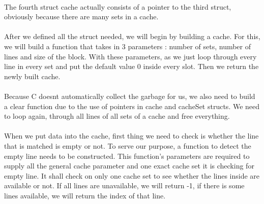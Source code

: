 \documentclass[a4paper]{article}
\begin{document}
\paragraph{} 
 The fourth struct cache actually consists of a pointer to the third struct, obviously because there are many sets in a cache. 

\paragraph{} 
After we defined all the struct needed, we will begin by building a cache. For this, we will build a function that takes in 3 parameters : number of sets, number of lines and size of the block. With these parameters, as we just loop through every line in every set and put the default value 0 inside every slot. Then we return the newly built cache. 



\paragraph{} 
Because C doesnt automatically collect the garbage for us, we also need to build a clear function due to the use of pointers in cache and cacheSet structs. We need to loop again, through all lines of all sets of a cache and free everything. 



\paragraph{} 
When we put data into the cache, first thing we need to check is whether the line that is matched is empty or not. To serve our purpose, a function to detect the empty line needs to be constructed. This function's parameters are required to supply all the  general cache parameter and one exact cache set it is checking for empty line. It shall check on only one cache set to see whether the lines inside are available or not. If all lines are unavailable, we will return -1, if there is some lines available, we will return the index of that line. 
\end{document}
